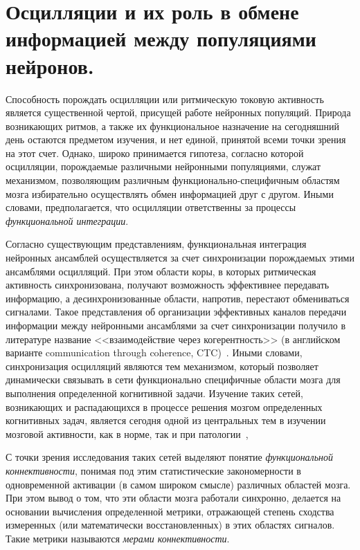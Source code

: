 \section{Осцилляции и их роль в обмене информацией между популяциями нейронов.}

Способность порождать осцилляции или ритмическую токовую активность является
существенной чертой, присущей работе нейронных популяций. Природа возникающих
ритмов, а также их функциональное назначение на сегодняшний день остаются
предметом изучения, и нет единой, принятой всеми точки зрения на этот счет.
Однако, широко принимается гипотеза, согласно которой осцилляции, порождаемые
различными нейронными популяциями, служат механизмом, позволяющим различным
функционально-специфичным областям мозга избирательно осуществлять обмен
информацией друг с другом. Иными словами, предполагается, что осцилляции
ответственны за процессы \emph{функциональной интеграции}.

Согласно существующим представлениям, функциональная интеграция нейронных
ансамблей осуществляется за счет синхронизации порождаемых этими ансамблями
осцилляций. При этом области коры, в которых ритмическая активность
синхронизована, получают возможность эффективнее передавать информацию, а
десинхронизованные области, напротив, перестают обмениваться сигналами. Такое
представления об организации эффективных каналов передачи информации между
нейронными ансамблями за счет синхронизации получило в литературе название
<<взаимодействие через когерентность>> (в английском варианте communication
through coherence, CTC)~\cite{Fries2015}. Иными словами, синхронизация
осцилляций являются тем механизмом, который позволяет динамически связывать в
сети функционально специфичные области мозга для выполнения определенной
когнитивной задачи. Изучение таких сетей, возникающих и распадающихся в
процессе решения мозгом определенных когнитивных задач, является сегодня одной
из центральных тем в изучении мозговой активности, как в норме, так и при
патологии~\cite{varela, baker, ossadtchi, Bastin2017},~\cite{Alamian_front2017,
Alamian_clin2017}

С точки зрения исследования таких сетей выделяют понятие \emph{функциональной
коннективности}, понимая под этим статистические закономерности в одновременной
активации (в самом широком смысле) различных областей мозга.
При этом вывод о том, что эти области мозга работали синхронно, делается на
основании вычисления определенной метрики, отражающей степень сходства
измеренных (или математически восстановленных) в этих областях сигналов.  Такие
метрики называются \emph{мерами коннективности}.

